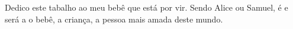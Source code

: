 
\vspace*{\fill}
\centering
\noindent
Dedico este tabalho ao meu bebê que está por vir. Sendo Alice ou Samuel, é e será a o bebê, a criança, a pessoa mais amada deste mundo.
\vspace*{\fill}
